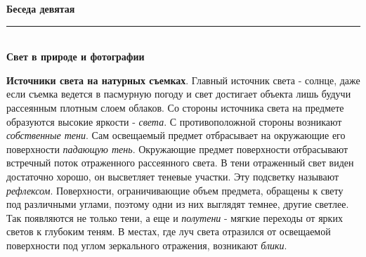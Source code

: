 \documentclass{article}
\renewcommand{\section}[2]{
	\vspace{2em}
	\begin{flushright}
		\Large
		\baselineskip=0.5\baselineskip
		\textbf{#1}
		\\
		\rule[0.5\baselineskip]{\textwidth}{0.15pt}
		\\
		\textbf{#2}
	\end{flushright}
}
\newcommand{\important}[1]{\textbf{#1}}
\begin{document}
\section{Беседа девятая}{Свет в природе и фотографии}
\important{Источники света на натурных съемках}. Главный источник света - солнце, даже если съемка ведется в пасмурную погоду и свет достигает объекта лишь будучи рассеянным плотным слоем облаков. Со стороны источника света на предмете образуются высокие яркости - \textit{света}. С противоположной стороны возникают \textit{собственные тени}. Сам освещаемый предмет отбрасывает на окружающие его поверхности \textit{падающую тень}. Окружающие предмет поверхности отбрасывают встречный поток отраженного рассеянного света. В тени отраженный свет виден достаточно хорошо, он высветляет теневые участки. Эту подсветку называют \textit{рефлексом}. Поверхности, ограничивающие объем предмета, обращены к свету под различными углами, поэтому одни из них выглядят темнее, другие светлее. Так появляются не только тени, а еще и \textit{полутени} - мягкие переходы от ярких светов к глубоким теням. В местах, где луч света отразился от освещаемой поверхности под углом зеркального отражения, возникают \textit{блики}.
\end{document}
